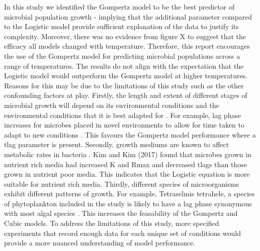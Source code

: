 \documentclass[11pt]{article}
\begin{document}
In this study we identified the Gompertz model to be the best predictor of microbial population growth - implying that the additional parameter compared to the Logistic model provide sufficient explanation of the data to justify its complexity. Moreover, there was no evidence from figure X to suggest that the efficacy all models changed with temperature. Therefore, this report encourages the use of the Gompertz model for predicting microbial populations across a range of temperatures. The results do not align with the expectation that the Logistic model would outperform the Gompertz model at higher temperatures. Reasons for this may be due to the limitations of this study such as the other confounding factors at play. Firstly, the length and extent of different stages of microbial growth will depend on its environmental conditions and the environmental conditions that it is best adapted for \cite{Dey2020}. For example, lag phase increases for microbes placed in novel environments to allow for time taken to adapt to new conditions \cite{Rolfe2012}. This favours the Gompertz model performance where a tlag parameter is present. Secondly, growth mediums are known to affect metabolic rates in bacteria \cite{KIM201764}. Kim and Kim (2017) found that microbes grown in nutrient rich media had increased K and Rmax and decreased tlags than those grown in nutrient poor media. This indicates that the Logistic equation is more suitable for nutrient rich media. Thirdly, different species of microorganisms exhibit different patterns of growth. For example, Tetraselmis tetrahele, a species of phytoplankton included in the study is likely to have a lag phase synonymous with most algal species \cite{ebaac5c3-39dd-33ef-a890-3745d155862c}. This increases the feasability of the Gompertz and Cubic models. To address the limitations of this study, more specified experiments that record enough data for each unique set of conditions would provide a more nuanced understanding of model performance.\\
\end{document}
